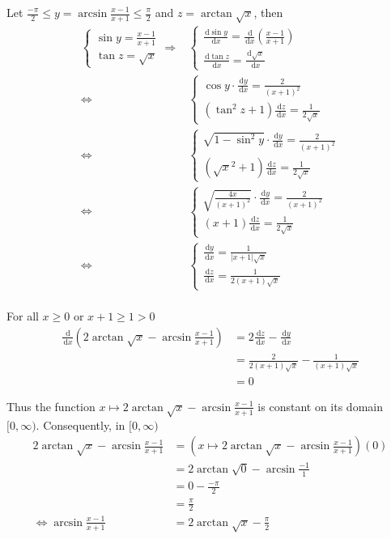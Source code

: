 \documentclass[a4paper,12pt]{article}
\newcommand{\ud}{\,\mathrm{d}}
\begin{document}
Let $\frac{-\pi}{2} \leq y = \arcsin\frac{x - 1}{x + 1} \leq \frac{\pi}{2}$ and
$z = \arctan\sqrt{x}$, then
\begin{align*}
\begin{cases}
  \sin{y} = \frac{x - 1}{x + 1}\\
  \tan{z} = \sqrt{x}
\end{cases}
\Longrightarrow&
\begin{cases}
  \frac{\ud\sin{y}}{\ud x} = \frac{\ud}{\ud x}\left(\frac{x - 1}{x + 1}\right)\\
  \frac{\ud\tan{z}}{\ud x} = \frac{\ud\sqrt{x}}{\ud x}
\end{cases}\\
\iff&
\begin{cases}
  \cos{y}\cdot\frac{\ud y}{\ud x} = \frac{2}{(x + 1)^2}\\
  \left(\tan^2{z} + 1\right)\frac{\ud z}{\ud x} = \frac{1}{2\sqrt{x}}
\end{cases}\\
\iff&
\begin{cases}
  \sqrt{1 - \sin^2{y}}\cdot\frac{\ud y}{\ud x} = \frac{2}{(x + 1)^2}\\
  \left(\sqrt{x}^2 + 1\right)\frac{\ud z}{\ud x} = \frac{1}{2\sqrt{x}}
\end{cases}\\
\iff&
\begin{cases}
  \sqrt{\frac{4x}{(x + 1)^2}}\cdot\frac{\ud y}{\ud x} = \frac{2}{(x + 1)^2}\\
  (x + 1)\frac{\ud z}{\ud x} = \frac{1}{2\sqrt{x}}
\end{cases}\\
\iff&
\begin{cases}
  \frac{\ud y}{\ud x} = \frac{1}{|x + 1|\sqrt{x}}\\
  \frac{\ud z}{\ud x} = \frac{1}{2(x + 1)\sqrt{x}}
\end{cases}\\
\end{align*}

For all $x \geq 0$ or $x + 1 \geq 1 > 0$
\begin{align*}
   \frac{\ud}{\ud x}\left(2\arctan\sqrt{x} - \arcsin\frac{x - 1}{x + 1}\right)
&= 2\frac{\ud z}{\ud x} - \frac{\ud y}{\ud x}\\
&= \frac{2}{2(x + 1)\sqrt{x}} - \frac{1}{(x + 1)\sqrt{x}}\\
&= 0
\end{align*}

Thus the function
$x \mapsto 2\arctan\sqrt{x} - \arcsin\frac{x - 1}{x + 1}$ is constant on its
domain $[0, \infty)$. Consequently, in $[0, \infty)$
\begin{align*}
   2\arctan\sqrt{x} - \arcsin\frac{x - 1}{x + 1}
&= \left(x \mapsto 2\arctan\sqrt{x} - \arcsin\frac{x - 1}{x + 1}\right)(0)\\
&= 2\arctan\sqrt{0} - \arcsin\frac{-1}{1}\\
&= 0 - \frac{-\pi}{2}\\
&= \frac{\pi}{2}\\
\iff \arcsin\frac{x - 1}{x + 1} &= 2\arctan\sqrt{x} - \frac{\pi}{2}
\end{align*}
\end{document}
